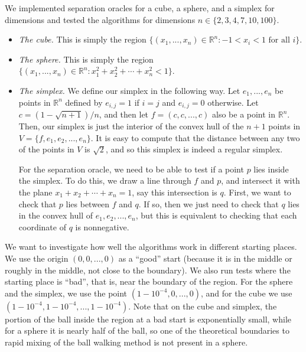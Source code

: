 \documentclass[11pt]{article}
\begin{document}
We implemented separation oracles for a cube, a sphere, and a simplex for dimensions and tested the algorithms for dimensions $n\in\{2,3,4,7,10,100\}$.
\begin{itemize}
\item \emph{The cube.} This is simply the region $\{(x_1,...,x_n) \in \mathbb{R}^n : -1 < x_i < 1\text{ for all }i\}$.
\item \emph{The sphere.} This is simply the region $\{(x_1,...,x_n)\in\mathbb{R}^n : x_1^2 + x_2^2 + \cdots + x_n^2 < 1\}$.
\item \emph{The simplex.} We define our simplex in the following way. Let $e_1,...,e_n$ be points in $\mathbb R^n$ defined by $e_{i,j} = 1$ if $i=j$ and $e_{i,j} = 0$ otherwise. Let $c = (1 - \sqrt{n+1}) / n$, and then let $f = (c,c,...,c)$ also be a point in $\mathbb R^n$. Then, our simplex is just the interior of the convex hull of the $n+1$ points in $V = \{f,e_1,e_2,...,e_n\}$. It is easy to compute that the distance between any two of the points in $V$ is $\sqrt{2}$, and so this simplex is indeed a regular simplex.

For the separation oracle, we need to be able to test if a point $p$ lies inside the simplex. To do this, we draw a line through $f$ and $p$, and intersect it with the plane $x_1 + x_2 + \cdots + x_n = 1$, say this intersection is $q$. First, we want to check that $p$ lies between $f$ and $q$. If so, then we just need to check that $q$ lies in the convex hull of $e_1,e_2,...,e_n$, but this is equivalent to checking that each coordinate of $q$ is nonnegative.
\end{itemize}

We want to investigate how well the algorithms work in different starting places. We use the origin $(0,0,...,0)$ as a ``good'' start (because it is in the middle or roughly in the middle, not close to the boundary). We also run tests where the starting place is ``bad'', that is, near the boundary of the region. For the sphere and the simplex, we use the point $(1 - 10^{-4}, 0, ..., 0)$, and for the cube we use $(1 - 10^{-4}, 1 - 10^{-4}, ..., 1 - 10^{-4})$. Note that on the cube and simplex, the portion of the ball inside the region at a bad start is exponentially small, while for a sphere it is nearly half of the ball, so one of the theoretical boundaries to rapid mixing of the ball walking method is not present in a sphere.
\end{document}

